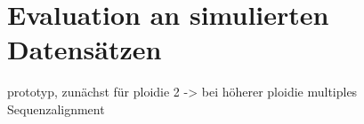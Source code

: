 \chapter{Evaluation an simulierten Datensätzen} \label{sec:}
prototyp, zunächst für ploidie 2 -> bei höherer ploidie multiples Sequenzalignment

\section{} \label{sec:}
\subsection{} \label{subsec:}